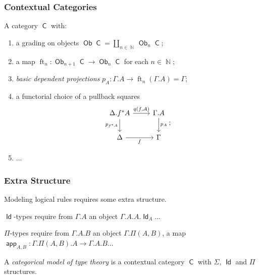 \documentclass{beamer}
\DeclareMathOperator{\Id}{\mathsf{Id}}
\DeclareMathOperator{\sfC}{\mathsf{C}}
\DeclareMathOperator{\N}{\mathbb{N}}
\DeclareMathOperator{\Ob}{\mathsf{Ob}}
\DeclareMathOperator{\ft}{ft}
\DeclareMathOperator{\app}{\mathsf{app}}
\begin{document}
\begin{frame}
  \frametitle{Contextual Categories}

  \begin{definition}
    A category $\sfC$ with:
    \begin{enumerate}
      \item a grading on objects $\Ob\sfC=\coprod_{n\in\N}\Ob_n\sfC$;
      \item a map $\ft_n\colon\Ob_{n+1}\sfC\rightarrow\Ob_n\sfC$ for each
        $n\in\N$;
      \item \emph{basic dependent projections}
        $p_A\colon\Gamma.A\rightarrow\ft_n(\Gamma.A)=\Gamma$;
      \item a functorial choice of a pullback squares
        \[\begin{tikzcd}[ampersand replacement=\&]
          {\Delta.f^*A} \& {\Gamma.A} \\
          \Delta \& \Gamma
          \arrow["{p_A}", from=1-2, to=2-2]
          \arrow["{p_{f^*A}}"', from=1-1, to=2-1]
          \arrow["{q(f,A)}", from=1-1, to=1-2]
          \arrow["f"', from=2-1, to=2-2]
        \end{tikzcd};\]
      \item ...
    \end{enumerate}
  \end{definition}
\end{frame}

\begin{frame}
  \frametitle{Extra Structure}
  Modeling logical rules requires some extra structure.

  $\Id$-types require from $\Gamma.A$ an object $\Gamma.A.A.\Id_A$...
  
  $\Pi$-types require from $\Gamma.A.B$ an object $\Gamma.\Pi(A,B)$, a map
  $\app_{A,B}\colon\Gamma.\Pi(A,B).A\rightarrow\Gamma.A.B$...

  \begin{defn}
    A \emph{categorical model of type theory} is a contextual category $\sfC$
    with $\Sigma$, $\Id$ and $\Pi$ structures.
  \end{defn}
\end{frame}
\end{document}
